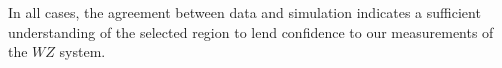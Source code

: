 In all cases, the agreement between data and simulation indicates a sufficient understanding of the selected region to lend confidence to our measurements of the $WZ$ system.

